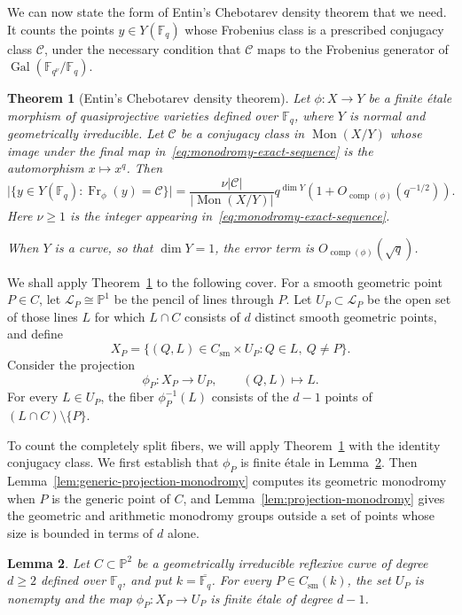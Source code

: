 \documentclass[12pt,reqno]{amsart}
\newtheorem{theorem}{Theorem}[section]
\newtheorem{lemma}[theorem]{Lemma}
\theoremstyle{definition}
\theoremstyle{remark}
\newcommand{\bF}{\mathbb{F}}
\newcommand{\Fq}{\mathbb{F}_q}
\newcommand{\bP}{\mathbb{P}}
\begin{document}
We can now state the form of Entin's Chebotarev density theorem \cite[Theorem~3]{Ent21} that we need. It counts the points $y\in Y(\Fq)$ whose Frobenius class is a prescribed conjugacy class $\mathcal C$, under the necessary condition that $\mathcal C$ maps to the Frobenius generator of $\operatorname{Gal}(\bF_{q^\nu}/\Fq)$.

\begin{theorem}[Entin's Chebotarev density theorem]\label{thm:entin-chebotarev}
Let $\phi\colon X\to Y$ be a finite \'etale morphism of quasiprojective varieties defined over $\Fq$, where $Y$ is normal and geometrically irreducible. Let $\mathcal{C}$ be a conjugacy class in $\operatorname{Mon}(X/Y)$ whose image under the final map in~\eqref{eq:monodromy-exact-sequence} is the automorphism $x\mapsto x^q$. Then
\[
\bigl|\{y\in Y(\Fq):\operatorname{Fr}_{\phi}(y)=\mathcal{C}\}\bigr|
=
\frac{\nu|\mathcal{C}|}{|\operatorname{Mon}(X/Y)|}q^{\dim Y}
\left(1+O_{\operatorname{comp}(\phi)}(q^{-1/2})\right).
\]
Here $\nu\geq 1$ is the integer appearing in~\eqref{eq:monodromy-exact-sequence}.

When $Y$ is a curve, so that $\dim Y=1$, the error term is
$O_{\operatorname{comp}(\phi)}(\sqrt q)$.
\end{theorem}

We shall apply Theorem~\ref{thm:entin-chebotarev} to the following cover. For a smooth geometric point $P\in C$, let $\mathcal L_P\cong\bP^1$ be the pencil of lines through $P$. Let $U_P\subset\mathcal L_P$ be the open set of those lines $L$ for which $L\cap C$ consists of $d$ distinct smooth geometric points, and define
\[
X_P=\{(Q,L)\in C_{\mathrm{sm}}\times U_P:Q\in L,\ Q\neq P\}.
\]
Consider the projection
\[
\phi_P\colon X_P\longrightarrow U_P,
\qquad
(Q,L)\longmapsto L.
\]
For every $L\in U_P$, the fiber $\phi_P^{-1}(L)$ consists of the $d-1$ points of $(L\cap C)\setminus\{P\}$.

To count the completely split fibers, we will apply Theorem~\ref{thm:entin-chebotarev} with the identity conjugacy class. We first establish that $\phi_P$ is finite \'etale in Lemma~\ref{lem:incidence-cover}. Then Lemma~\ref{lem:generic-projection-monodromy} computes its geometric monodromy when $P$ is the generic point of $C$, and Lemma~\ref{lem:projection-monodromy} gives the geometric and arithmetic monodromy groups outside a set of points whose size is bounded in terms of $d$ alone.

\begin{lemma}\label{lem:incidence-cover}
Let $C\subset\bP^2$ be a geometrically irreducible reflexive curve of degree $d\geq2$ defined over $\Fq$, and put $k=\overline{\Fq}$. For every $P\in C_{\mathrm{sm}}(k)$, the set $U_P$ is nonempty and the map $\phi_P\colon X_P\to U_P$ is finite \'etale of degree $d-1$.
\end{lemma}
\end{document}

